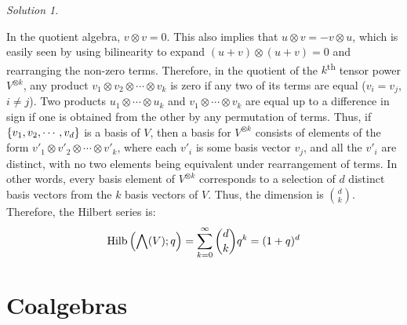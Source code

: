 \documentclass{article}
\theoremstyle{definition}
\theoremstyle{remark}
\newtheorem*{Solution*}{Solution}
\theoremstyle{underline}
\theoremstyle{underline}
\DeclareMathOperator{\Hilb}{Hilb}
\renewcommand{\th}{\textsuperscript{th}\xspace}
\begin{document}
\begin{Solution*}
\begin{subquests}
			\item In the quotient algebra, $v \otimes v = 0$. This also implies that $u \otimes v = - v \otimes u$, which is easily seen by using bilinearity to expand $(u + v) \otimes (u + v) = 0$ and rearranging the non-zero terms. Therefore, in the quotient of the $k$\th tensor power $V^{\otimes k}$, any product $v_1 \otimes v_2 \otimes \cdots \otimes v_k$ is zero if any two of its terms are equal ($v_i = v_j$, $i \ne j$). Two products $u_1 \otimes \cdots \otimes u_k$ and $v_1 \otimes \cdots \otimes v_k$ are equal up to a difference in sign if one is obtained from the other by any permutation of terms. Thus, if $\qty{v_1, v_2, \cdots, v_d}$ is a basis of $V$, then a basis for $V^{\otimes k}$ consists of elements of the form $v'_1 \otimes v'_2 \otimes \cdots \otimes v'_k$, where each $v'_i$ is some basis vector $v_j$, and all the $v'_i$ are distinct, with no two elements being equivalent under rearrangement of terms. In other words, every basis element of $V^{\otimes k}$ corresponds to a selection of $d$ distinct basis vectors from the $k$ basis vectors of $V$. Thus, the dimension is $\binom d k$. Therefore, the Hilbert series is:
			\begin{gather*}
				\Hilb\pqty{\bigwedge(V);q} = \sum_{k=0}^{\infty} \binom d k q^k = (1 + q)^d
			\end{gather*}
 		\end{subquests}
	\end{Solution*}


	\section{Coalgebras}
\end{document}
